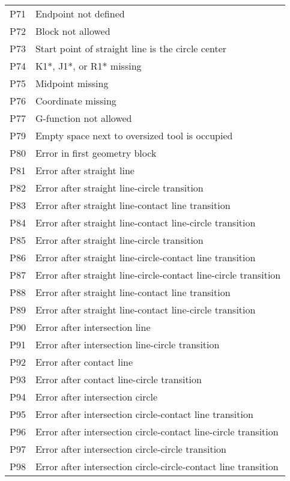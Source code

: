 \documentclass[openany,11pt]{book}
\begin{document}
\begin{table}[!h]
\begin{tabular}{ll}
    P71 & Endpoint not defined \\
    P72 & Block not allowed \\
    P73 & Start point of straight line is the circle center \\
    P74 & K1*, J1*, or R1* missing \\
    P75 & Midpoint missing \\
    P76 & Coordinate missing \\
    P77 & G-function not allowed \\
    P79 & Empty space next to oversized tool is occupied \\
    P80 & Error in first geometry block \\
    P81 & Error after straight line \\
    P82 & Error after straight line-circle transition \\
    P83 & Error after straight line-contact line transition \\
    P84 & Error after straight line-contact line-circle transition \\
    P85 & Error after straight line-circle transition \\
    P86 & Error after straight line-circle-contact line transition \\
    P87 & Error after straight line-circle-contact line-circle transition \\
    P88 & Error after straight line-contact line transition \\
    P89 & Error after straight line-contact line-circle transition \\
    P90 & Error after intersection line \\
    P91 & Error after intersection line-circle transition \\
    P92 & Error after contact line \\
    P93 & Error after contact line-circle transition \\
    P94 & Error after intersection circle \\
    P95 & Error after intersection circle-contact line transition \\
    P96 & Error after intersection circle-contact line-circle transition \\
    P97 & Error after intersection circle-circle transition \\
    P98 & Error after intersection circle-circle-contact line transition \\
    \end{tabular}
\end{table}
\end{document}
